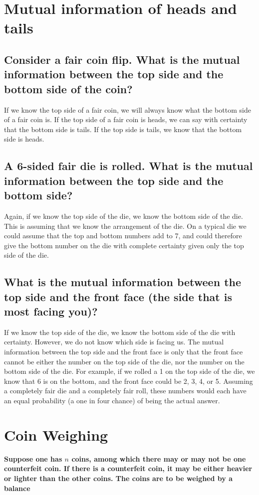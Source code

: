 \documentclass[11pt, oneside]{book}   	%
\begin{document}
\section{Mutual information of heads and tails}
\subsection{Consider a fair coin flip.  What is the mutual information between the top side and the bottom side of the coin?}If we know the top side of a fair coin, we will always know what the bottom side of a fair coin is.  If the top side of a fair coin is heads, we can say with certainty that the bottom side is tails.  If the top side is tails, we know that the bottom side is heads.
\subsection{A 6-sided fair die is rolled.  What is the mutual information between the top side and the bottom side?}
Again, if we know the top side of the die, we know the bottom side of the die.  This is assuming that we know the arrangement of the die.  On a typical die we could assume that the top and bottom numbers add to 7, and could therefore give the bottom number on the die with complete certainty given only the top side of the die.
\subsection{What is the mutual information between the top side and the front face (the side that is most facing you)?}

If we know the top side of the die, we know the bottom side of the die with certainty.  However, we do not know which side is facing us.  The mutual information between the top side and the front face is only that the front face cannot be either the number on the top side of the die, nor the number on the bottom side of the die.  For example, if we rolled a 1 on the top side of the die, we know that 6 is on the bottom, and the front face could be 2, 3, 4, or 5.  Assuming a completely fair die and a completely fair roll, these numbers would each have an equal probability (a one in four chance) of being the actual answer.  

\section{Coin Weighing}
\textbf{Suppose one has $n$ coins, among which there may or may not be one counterfeit coin.  If there is a counterfeit coin, it may be either heavier or lighter than the other coins.  The coins are to be weighed by a balance}
\end{document}
